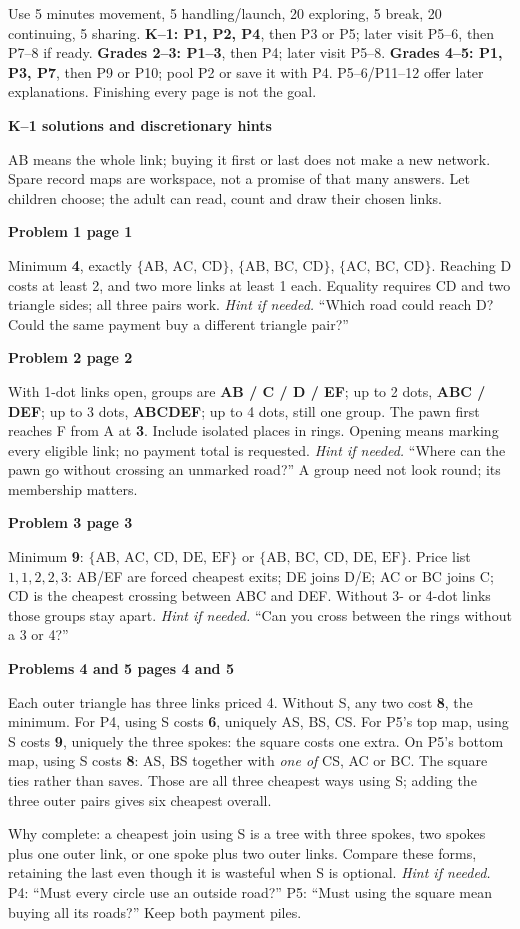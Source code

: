 \documentclass[11pt]{article}
\newcommand{\head}[1]{\par{\large\bfseries #1}\par\nobreak}
\newcommand{\sub}[1]{\par\textbf{#1}\par\nobreak}
\newcommand{\hint}[1]{\textit{Hint if needed.} #1}
\newcommand{\links}[1]{\ensuremath{\{\text{#1}\}}}
\begin{document}
Use 5 minutes movement, 5 handling/launch, 20 exploring, 5 break, 20 continuing, 5 sharing. \textbf{K--1: P1, P2, P4}, then P3 or P5; later visit P5--6, then P7--8 if ready. \textbf{Grades 2--3: P1--3}, then P4; later visit P5--8. \textbf{Grades 4--5: P1, P3, P7}, then P9 or P10; pool P2 or save it with P4. P5--6/P11--12 offer later explanations. Finishing every page is not the goal.
\newpage
\head{K--1 solutions and discretionary hints}
AB means the whole link; buying it first or last does not make a new network. Spare record maps are workspace, not a promise of that many answers. Let children choose; the adult can read, count and draw their chosen links.

\sub{Problem 1 page 1}
Minimum \textbf{4}, exactly \links{AB, AC, CD}, \links{AB, BC, CD}, \links{AC, BC, CD}. Reaching D costs at least 2, and two more links at least 1 each. Equality requires CD and two triangle sides; all three pairs work. \hint{``Which road could reach D? Could the same payment buy a different triangle pair?''}

\sub{Problem 2 page 2}
With 1-dot links open, groups are \textbf{AB / C / D / EF}; up to 2 dots, \textbf{ABC / DEF}; up to 3 dots, \textbf{ABCDEF}; up to 4 dots, still one group. The pawn first reaches F from A at \textbf{3}. Include isolated places in rings. Opening means marking every eligible link; no payment total is requested. \hint{``Where can the pawn go without crossing an unmarked road?''} A group need not look round; its membership matters.

\sub{Problem 3 page 3}
Minimum \textbf{9}: \links{AB, AC, CD, DE, EF} or \links{AB, BC, CD, DE, EF}. Price list $1,1,2,2,3$: AB/EF are forced cheapest exits; DE joins D/E; AC or BC joins C; CD is the cheapest crossing between ABC and DEF. Without 3- or 4-dot links those groups stay apart. \hint{``Can you cross between the rings without a 3 or 4?''}

\sub{Problems 4 and 5 pages 4 and 5}\label{starforms}
Each outer triangle has three links priced 4. Without S, any two cost \textbf{8}, the minimum. For P4, using S costs \textbf{6}, uniquely AS, BS, CS. For P5's top map, using S costs \textbf{9}, uniquely the three spokes: the square costs one extra. On P5's bottom map, using S costs \textbf{8}: AS, BS together with \emph{one of} CS, AC or BC. The square ties rather than saves. Those are all three cheapest ways using S; adding the three outer pairs gives six cheapest overall.

Why complete: a cheapest join using S is a tree with three spokes, two spokes plus one outer link, or one spoke plus two outer links. Compare these forms, retaining the last even though it is wasteful when S is optional. \hint{P4: ``Must every circle use an outside road?'' P5: ``Must using the square mean buying all its roads?''} Keep both payment piles.
\end{document}
